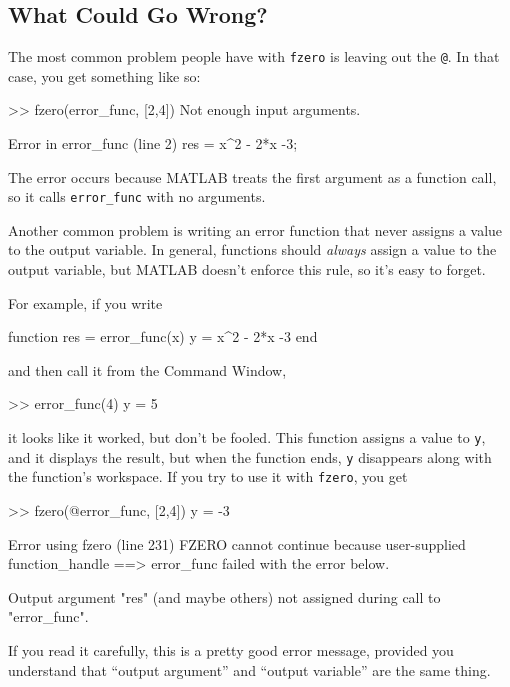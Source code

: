 \subsection{What Could Go Wrong?}

The most common problem people have with \lstinline{fzero} is leaving
out the \lstinline{@}.  In that case, you get something like so:

\begin{code}
>> fzero(error_func, [2,4])
Not enough input arguments.

Error in error_func (line 2)
    res = x^2 - 2*x -3;
\end{code}

The error occurs because MATLAB treats the first argument as a function call, so it calls \lstinline{error_func} with no arguments.


Another common problem is writing an error function that never
assigns a value to the output variable.  In general, functions should
\emph{always} assign a value to the output variable, but MATLAB doesn't
enforce this rule, so it's easy to forget.

For example, if you
write

\begin{code}
function res = error_func(x)
    y = x^2 - 2*x -3
end
\end{code}
and then call it from the Command Window,
\begin{code}
>> error_func(4)
y = 5
\end{code}
it looks like it worked, but don't be fooled.  This function assigns
a value to \lstinline{y}, and it displays the result, but when the function
ends, \lstinline{y} disappears along with the function's workspace.
If you try to use it with \lstinline{fzero}, you get

\begin{code}
>> fzero(@error_func, [2,4])
y = -3

Error using fzero (line 231)
FZERO cannot continue because user-supplied function_handle ==>
error_func failed with the error below.

Output argument "res" (and maybe others) not assigned during call
to "error_func".
\end{code}

If you read it carefully, this is a pretty good error message,
provided you understand that ``output argument'' and ``output variable'' are the same thing.

